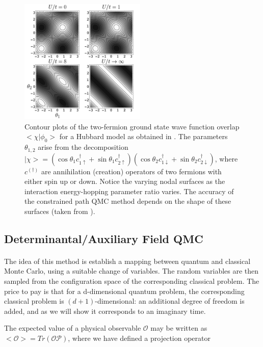 \documentclass[10pt, twocolumn, twoside]{article}
\begin{document}
\begin{figure}[ht!]
\centering
\includegraphics[width = 6cm]{constrained.png}
\caption{ Contour plots of the two-fermion ground state wave function overlap $<\chi | \phi_0 >$ for a Hubbard model as obtained in \cite{constrained2}. The parameters $\theta_{1,2}$ arise from the decomposition $|\chi > = (\cos\theta_1 c_{1\uparrow}^\dagger + \sin\theta_1 c_{2\uparrow}^\dagger) (\cos\theta_2 c_{1\downarrow}^\dagger + \sin\theta_2 c_{2\downarrow}^\dagger)$, where $c^{(\dagger)}$ are annihilation (creation) operators of two fermions with either spin up or down. Notice the varying nodal surfaces as the interaction energy-hopping parameter ratio varies. The accuracy of the constrained path QMC method depends on the shape of these surfaces (taken from \cite{constrained2}). }
\end{figure}

\subsection{Determinantal/Auxiliary Field QMC}\paragraph{}

The idea of this method is establish a mapping between quantum and classical Monte Carlo, using a suitable change of variables. The random variables are then sampled from the configuration space of the corresponding classical problem. The price to pay is that for a d-dimensional quantum problem, the corresponding classical problem is $(d+1)$-dimensional: an additional degree of freedom is added, and as we will show it corresponds to an imaginary time.

The expected value of a physical observable $\mathcal{O}$ may be written as $<\mathcal{O}> = Tr (\mathcal{O}\mathcal{P})$, where we have defined a projection operator
\end{document}
